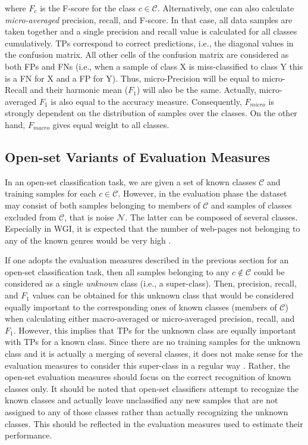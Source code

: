 \noindent 
where $F_c$ is the F-score for the class $c \in \mathcal{C}$. Alternatively, one can also calculate \textit{micro-averaged} precision, recall, and F-score. In that case, all data samples are taken together and a single precision and recall value is calculated for all classes cumulatively. TPs correspond to correct predictions, i.e., the diagonal values in the confusion matrix.  All other cells of the confusion matrix are considered as both FPs and FNs (i.e., when a sample of class X is miss-classified to class Y this is a FN for X and a FP for Y). Thus, micro-Precision will be equal to micro-Recall and their harmonic mean  ($F_{1}$) will also be the same. Actually, micro-averaged $F_{1}$ is also equal to the accuracy measure. Consequently, $F_{micro}$ is strongly dependent on the distribution of samples over the classes. On the other hand, $F_{macro}$ gives equal weight to all classes.

\subsection{Open-set Variants of Evaluation Measures}\label{chap:eval_methods:sec:openset_measures}

In an open-set classification task, we are given a set of known classes $\mathcal{C}$ and training samples for each $c \in \mathcal{C}$. However, in the evaluation phase the dataset may consist of both samples belonging to members of $\mathcal{C}$ and samples of classes excluded from $\mathcal{C}$, that is noise $\mathcal{N}$. The latter can be composed of several classes. Especially in WGI, it is expected that the number of web-pages not belonging to any of the known genres would be very high \parencite{Asheghi2015}. 

If one adopts the evaluation measures described in the previous section for an open-set classification task, then all samples belonging to any $c \notin \mathcal{C}$ could be considered as a single \textit{unknown} class (i.e., a super-class). Then, precision, recall, and $F_{1}$ values can be obtained for this unknown class that would be considered equally important to the corresponding ones of known classes (members of $\mathcal{C}$) when calculating either macro-averaged or micro-averaged precision, recall, and $F_{1}$. However, this implies that TPs for the unknown class are equally important with TPs for a known class. Since there are no training samples for the unknown class and it is actually a merging of several classes, it does not make sense for the evaluation measures to consider this super-class in a  regular way \parencite{mendesjunior2016}. Rather, the open-set evaluation measures should focus on the correct recognition of known classes only. It should be noted that open-set classifiers attempt to recognize the known classes and actually leave unclassified any new samples that are not assigned to any of those classes rather than actually recognizing the unknown classes. This should be reflected in the evaluation measures used to estimate their performance. 

